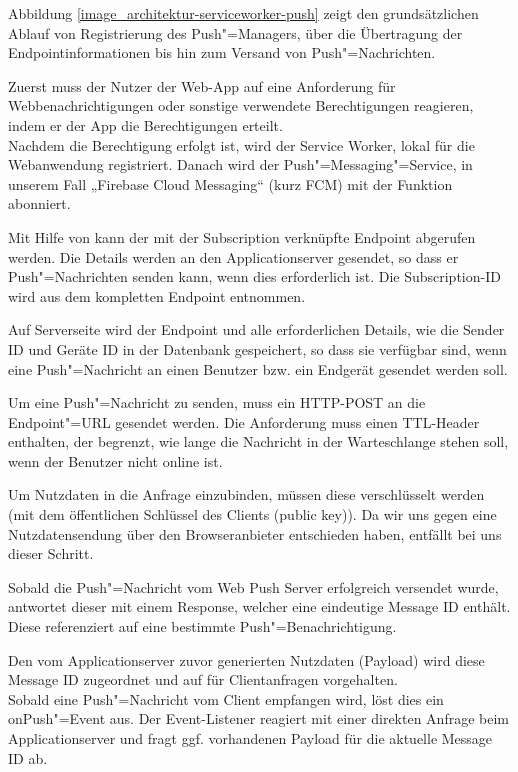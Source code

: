 Abbildung \ref{image_architektur-serviceworker-push} zeigt den grundsätzlichen Ablauf von Registrierung des Push"=Managers, über die Übertragung der Endpointinformationen bis hin zum Versand von Push"=Nachrichten.

Zuerst  muss der Nutzer der Web-App auf eine Anforderung für Webbenachrichtigungen oder sonstige verwendete Berechtigungen reagieren, indem er der App die Berechtigungen erteilt. \\
Nachdem die Berechtigung erfolgt ist, wird der Service Worker, lokal  für die Webanwendung registriert. 
Danach wird der Push"=Messaging"=Service, in unserem Fall „Firebase Cloud Messaging“ (kurz FCM) mit der Funktion  abonniert. 

Mit Hilfe von  kann der mit der Subscription verknüpfte Endpoint abgerufen werden. Die Details werden an den Applicationserver gesendet, so dass er Push"=Nachrichten senden kann, wenn dies erforderlich ist. Die Subscription-ID wird aus dem kompletten Endpoint entnommen. 

Auf Serverseite wird der Endpoint und alle erforderlichen Details, wie die Sender ID und Geräte ID in der Datenbank gespeichert, so dass sie verfügbar sind, wenn eine Push"=Nachricht an einen Benutzer bzw. ein Endgerät gesendet werden soll. 

Um eine Push"=Nachricht zu senden, muss ein HTTP-POST an die Endpoint"=URL gesendet werden. Die Anforderung muss einen TTL-Header enthalten, der begrenzt, wie lange die Nachricht in der Warteschlange stehen soll, wenn der Benutzer nicht online ist.  

Um Nutzdaten in die Anfrage einzubinden, müssen diese verschlüsselt werden (mit dem öffentlichen Schlüssel des Clients (public key)).
Da wir uns gegen eine Nutzdatensendung über den Browseranbieter entschieden haben, entfällt bei uns dieser Schritt. 

Sobald die Push"=Nachricht vom Web Push Server erfolgreich versendet wurde, antwortet dieser mit einem Response, welcher eine eindeutige Message ID enthält. Diese referenziert auf eine bestimmte Push"=Benachrichtigung.

Den vom Applicationserver zuvor generierten Nutzdaten (Payload) wird diese Message ID zugeordnet und auf für Clientanfragen vorgehalten. \\
Sobald eine Push"=Nachricht vom Client empfangen wird, löst dies ein onPush"=Event aus. Der Event-Listener reagiert mit einer direkten Anfrage beim Applicationserver und fragt ggf. vorhandenen Payload für die aktuelle Message ID ab.

